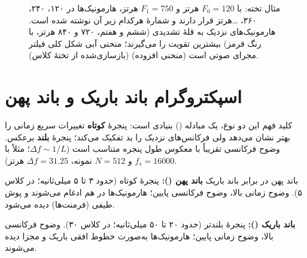 \begin{figure}[htbp]
\centering
{}
\caption{مثال تخته: با $F_0=120$ هرتز و $F_1=750$ هرتز، هارمونیک‌ها در ۱۲۰، ۲۴۰، ۳۶۰، \dots هرتز قرار دارند و شمارهٔ هرکدام زیر آن نوشته شده است. هارمونیک‌های نزدیک به قلهٔ تشدیدی (ششم و هفتم، ۷۲۰ و ۸۴۰ هرتز، با رنگ قرمز) بیشترین تقویت را می‌گیرند؛ منحنی آبی شکل کلی فیلتر مجرای صوتی است (منحنی افزوده) (بازسازی‌شده از تختهٔ کلاس).}
\label{fig:ch03-harmonics-f1}
\end{figure}

\section{اسپکتروگرام باند باریک و باند پهن}

کلید فهم این دو نوع، یک مبادله () بنیادی است: پنجرهٔ \textbf{کوتاه} تغییرات سریع زمانی را بهتر نشان می‌دهد ولی فرکانس‌های نزدیک را بد تفکیک می‌کند؛ پنجرهٔ \textbf{بلند} برعکس. وضوح فرکانسی تقریباً با معکوس طول پنجره متناسب است ($\Delta f\sim 1/L$؛ مثلاً با $f_s=16000$ و $N=512$ نمونه، $\Delta f=31.25$ هرتز).

\begin{definitionbox}{باند پهن در برابر باند باریک}
\textbf{باند پهن ():} پنجرهٔ کوتاه (حدود ۳ تا ۵ میلی‌ثانیه؛ در کلاس ۵). وضوح زمانی بالا، وضوح فرکانسی پایین؛ هارمونیک‌ها در هم ادغام می‌شوند و پوش طیفی (فرمنت‌ها) دیده می‌شود.

\textbf{باند باریک ():} پنجرهٔ بلندتر (حدود ۲۰ تا ۵۰ میلی‌ثانیه؛ در کلاس ۳۰). وضوح فرکانسی بالا، وضوح زمانی پایین؛ هارمونیک‌ها به‌صورت خطوط افقی باریک و مجزا دیده می‌شوند.
\end{definitionbox}

